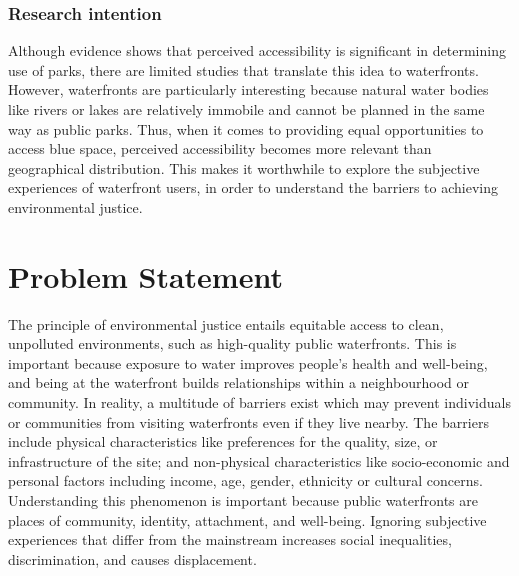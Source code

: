 \documentclass{article}
\begin{document}
\subsubsection{Research intention}

Although evidence shows that perceived accessibility is significant in determining use of parks, there are limited studies that translate this idea to waterfronts.
However, waterfronts are particularly interesting because natural water bodies like rivers or lakes are relatively immobile and cannot be planned in the same way as public parks. 
Thus, when it comes to providing equal opportunities to access blue space, perceived accessibility becomes more relevant than geographical distribution. 
This makes it worthwhile to explore the subjective experiences of waterfront users, in order to understand the barriers to achieving environmental justice.


\section{Problem Statement}

The principle of environmental justice entails equitable access to clean, unpolluted environments, such as high-quality public waterfronts. This is important because exposure to water improves people's health and well-being, and being at the waterfront builds relationships within a neighbourhood or community.
In reality, a multitude of barriers exist which may prevent individuals or communities from visiting waterfronts even if they live nearby. The barriers include physical characteristics like preferences for the quality, size, or infrastructure of the site; and non-physical characteristics like socio-economic and personal factors including income, age, gender, ethnicity or cultural concerns.
Understanding this phenomenon is important because public waterfronts are places of community, identity, attachment, and well-being. Ignoring subjective experiences that differ from the mainstream increases social inequalities, discrimination, and causes displacement.
\end{document}
